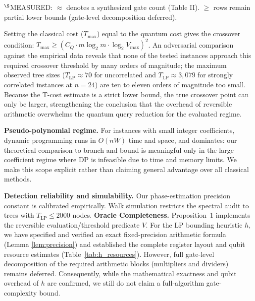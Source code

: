 \documentclass[conference]{IEEEtran} \IEEEoverridecommandlockouts
\begin{document}
\begin{table}[htbp]
\caption{Per-Query T-Cost Estimates ($C_Q$) and Required Crossover Thresholds ($T_{\max}$)}
\label{tab:crossover}
\begin{center}
\begin{flushleft}
\footnotesize
$^\S$MEASURED: $\approx$ denotes a synthesized gate count (Table II). $\ge$ rows remain partial lower bounds (gate-level decomposition deferred).
\end{flushleft}
\end{center}
\end{table}

Setting the classical cost ($T_{\max}$) equal to the quantum cost gives the crossover condition: $T_{\max} \ge (C_Q \cdot m \log_2 m \cdot \log_2 V_{\max})^2$. An adversarial comparison against the empirical data reveals that none of the tested instances approach this required crossover threshold by many orders of magnitude; the maximum observed tree sizes ($T_{\text{LP}} \approx 70$ for uncorrelated and $T_{\text{LP}} \approx 3{,}079$ for strongly correlated instances at $n=24$) are ten to eleven orders of magnitude too small. Because the T-cost estimate is a strict lower bound, the true crossover point can only be larger, strengthening the conclusion that the overhead of reversible arithmetic overwhelms the quantum query reduction for the evaluated regime.

\textbf{Pseudo-polynomial regime.} For instances with small integer coefficients, dynamic programming runs in $O(nW)$ time and space, and dominates: our theoretical comparison to branch-and-bound is meaningful only in the large-coefficient regime where DP is infeasible due to time and memory limits. We make this scope explicit rather than claiming general advantage over all classical methods.

\textbf{Detection reliability and simulability.} Our phase-estimation precision constant is calibrated empirically. Walk simulation restricts the spectral audit to trees with $T_{\text{LP}} \le 2000$ nodes. \textbf{Oracle Completeness.} Proposition~1 implements the reversible evaluation/threshold predicate $V$. For the LP bounding heuristic $h$, we have specified and verified an exact fixed-precision arithmetic formula (Lemma \ref{lem:precision}) and established the complete register layout and qubit resource estimates (Table~\ref{tab:h_resources}). However, full gate-level decomposition of the required arithmetic blocks (multipliers and dividers) remains deferred. Consequently, while the mathematical exactness and qubit overhead of $h$ are confirmed, we still do not claim a full-algorithm gate-complexity bound.
\end{document}
